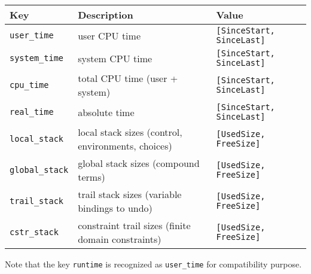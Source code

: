 \begin{tabular}{|l|l|l|}
\hline

Key & Description & Value \\

\hline\hline

\texttt{user\_time} & user CPU time & \texttt{[SinceStart, SinceLast]} \\

\hline

\texttt{system\_time} & system CPU time & \texttt{[SinceStart, SinceLast]}
\\

\hline

\texttt{cpu\_time} & total CPU time (user + system) & \texttt{[SinceStart,
SinceLast]} \\

\hline

\texttt{real\_time} & absolute time & \texttt{[SinceStart, SinceLast]} \\

\hline

\texttt{local\_stack} & local stack sizes (control, environments, choices) & \texttt{[UsedSize, FreeSize]} \\

\hline

\texttt{global\_stack} & global stack sizes (compound terms) &
\texttt{[UsedSize, FreeSize]} \\

\hline

\texttt{trail\_stack} & trail stack sizes (variable bindings to undo) &
\texttt{[UsedSize, FreeSize]} \\

\hline

\texttt{cstr\_stack} & constraint trail sizes (finite domain constraints) &
\texttt{[UsedSize, FreeSize]} \\

\hline
\end{tabular}

Note that the key \texttt{runtime} is recognized as \texttt{user\_time} for
compatibility purpose.


\begin{PlErrors}




\end{PlErrors}

